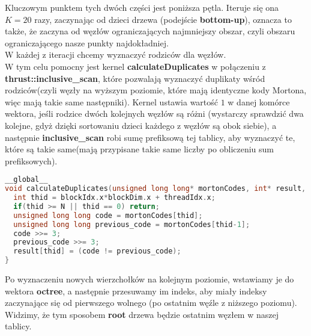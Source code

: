 \documentclass[14pt,twoside,a4paper]{article}
\theoremstyle{definition}
\begin{document}
Kluczowym punktem tych dwóch części jest poniższa pętla. Iteruje się ona $K=20$ razy, zaczynając od dzieci drzewa (podejście \textbf{bottom-up}), oznacza to także, że zaczyna od węzłów ograniczających najmniejszy obszar, czyli obszaru ograniczającego nasze punkty najdokładniej.\\
W każdej z iteracji chcemy wyznaczyć rodziców dla węzłów. \\W tym celu pomocny jest kernel \textbf{calculateDuplicates} w połączeniu z \textbf{thrust::inclusive\_scan}, które pozwalają wyznaczyć duplikaty wśród rodziców(czyli węzły na wyższym poziomie, które mają identyczne kody Mortona, więc mają takie same następniki).
Kernel ustawia wartość $1$ w danej komórce wektora, jeśli rodzice dwóch kolejnych węzłów są różni (wystarczy sprawdzić dwa kolejne, gdyż dzięki sortowaniu dzieci każdego z węzłów są obok siebie), a następnie \textbf{inclusive\_scan} robi sumę prefiksową tej tablicy, aby wyznaczyć te, które są takie same(mają przypisane takie same liczby po obliczeniu sum prefiksowych).

\begin{lstlisting}[language=C++, frame=single, framerule=2pt, caption=Kernel calculateDuplicates]
__global__
void calculateDuplicates(unsigned long long* mortonCodes, int* result, int N) {
  int thid = blockIdx.x*blockDim.x + threadIdx.x;
  if(thid >= N || thid == 0) return;
  unsigned long long code = mortonCodes[thid];
  unsigned long long previous_code = mortonCodes[thid-1];
  code >>= 3;
  previous_code >>= 3;
  result[thid] = (code != previous_code);
}

\end{lstlisting}
\bigskip
Po wyznaczeniu nowych wierzchołków na kolejnym poziomie, wstawiamy je do wektora \textbf{octree}, a następnie przesuwamy im indeks, aby miały indeksy zaczynające się od pierwszego wolnego (po ostatnim węźle z niższego poziomu). Widzimy, że tym sposobem \textbf{root} drzewa będzie ostatnim węzłem w naszej tablicy.
\end{document}
